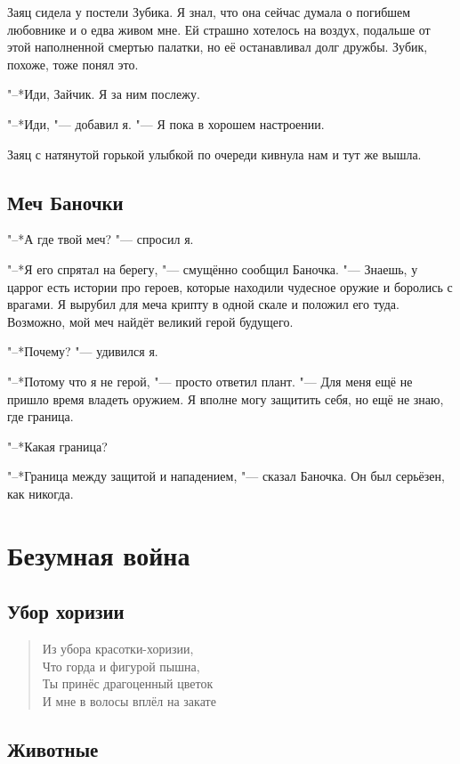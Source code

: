 \documentclass[a4paper,10pt]{book}
\newcommand{\ldotst}{\so{...}\xspace}
\begin{document}
Заяц сидела у постели Зубика. Я знал, что она сейчас думала о погибшем 
любовнике и о едва живом мне. Ей страшно хотелось на воздух, подальше от этой 
наполненной смертью палатки, но её останавливал долг дружбы. Зубик, похоже, 
тоже понял это.

"--*Иди, Зайчик. Я за ним послежу.

"--*Иди, "--- добавил я. "--- Я пока в хорошем настроении.

Заяц с натянутой горькой улыбкой по очереди кивнула нам и тут же вышла.

 
\section{Меч Баночки}

"--*А где твой меч? "--- спросил я.

"--*Я его спрятал на берегу, "--- смущённо сообщил Баночка. "--- Знаешь, у 
царрог есть истории про героев, которые находили чудесное оружие и боролись с 
врагами. Я вырубил для меча крипту в одной скале и положил его туда. Возможно, 
мой меч найдёт великий герой будущего.

"--*Почему? "--- удивился я.

"--*Потому что я не герой, "--- просто ответил плант. "--- Для меня ещё не 
пришло время владеть оружием. Я вполне могу защитить себя, но ещё не знаю, где 
граница.

"--*Какая граница?

"--*Граница между защитой и нападением, "--- сказал Баночка. Он был серьёзен, 
как никогда.

\chapter{Безумная война}
 
 \section{Убор хоризии}
 
\begin{verse}
Из убора красотки-хоризии,\\
Что горда и фигурой пышна,\\
Ты принёс драгоценный цветок\\
И мне в волосы вплёл на закате\ldotst
\end{verse}

 \section{Животные}
 
\end{document}
